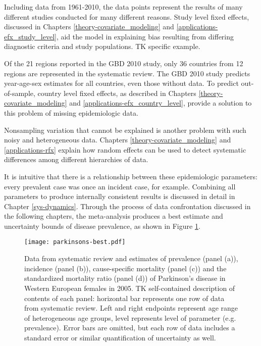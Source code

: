 Including data from 1961-2010, the data points represent the results of many different studies conducted for many different reasons.  Study level fixed effects, discussed in Chapters \ref{theory-covariate_modeling} and \ref{applications-efx_study_level}, aid the model in explaining bias resulting from differing diagnostic criteria and study populations. TK specific example.

Of the 21 regions reported in the GBD 2010 study, only 36 countries from 12 regions are represented in the systematic review.  The GBD 2010 study predicts year-age-sex estimates for all countries, even those without data.  To predict out-of-sample, country level fixed effects, as described in Chapters \ref{theory-covariate_modeling} and \ref{applications-efx_country_level}, provide a solution to this problem of missing epidemiologic data.

Nonsampling variation that cannot be explained is another problem with such noisy and heterogeneous data.  Chapters \ref{theory-covariate_modeling} and \ref{applications-rfx} explain how random effects can be used to detect systematic differences among different hierarchies of data.

It is intuitive that there is a relationship between these epidemiologic parameters: every prevalent case was once an incident case, for example.  Combining all parameters to produce internally consistent results is discussed in detail in Chapter \ref{sys-dynamics}.  Through the process of data confrontation discussed in the following chapters, the meta-analysis produces a best estimate and uncertainty bounds of disease prevalence, as shown in Figure \ref{fig:intro-parkinsons fit}.

    \begin{figure}[h]
        \begin{center}
            \texttt{[image: parkinsons-best.pdf]}
            \caption{Data from systematic review and estimates of prevalence (panel (a)), incidence (panel (b)), cause-specific mortality (panel (c)) and the standardized mortality ratio (panel (d)) of Parkinson's disease in Western European females in 2005. TK self-contained description of contents of each panel: horizontal bar represents one row of data from systematic review.  Left and right endpoints represent age range of heterogeneous age groups, level represents level of parameter (e.g. prevalence).  Error bars are omitted, but each row of data includes a standard error or similar quantification of uncertainty as well.}
            \label{fig:intro-parkinsons fit}
        \end{center}
    \end{figure} 
